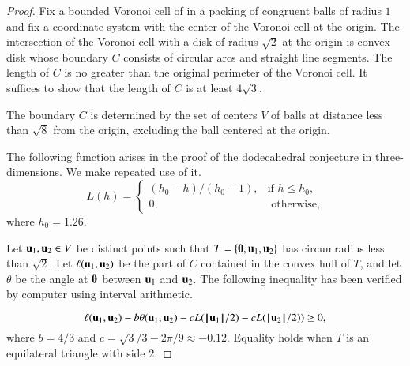 \documentclass{llncs}
\begin{document}
\begin{proof} Fix a bounded Voronoi cell of in a packing of congruent
  balls of radius $1$ and fix a coordinate system with the center of
  the Voronoi cell at the origin.  The intersection of the Voronoi
  cell with a disk of radius $\sqrt2$ at the origin is convex disk
  whose boundary $C$ consists of circular arcs and straight line
  segments.  The length of $C$ is no greater than the original
  perimeter of the Voronoi cell.  It suffices to show that the length
  of $C$ is at least $4\sqrt{3}$.



The boundary $C$ is determined by the set of centers $V$ of balls at
distance less than $\sqrt8$ from the origin, excluding the ball
centered at the origin.

The following function arises in the proof of the dodecahedral
conjecture in three-dimensions.  We make repeated use of it.
\begin{equation}
L(h) = \begin{cases} 
   (h_0-h)/(h_0-1),& \text{if } h \le h_0,\\
  0,&\text{ otherwise},
 \end{cases}
\end{equation}
where $h_0 = 1.26$. 

Let ${\mathbf u}_1,{\mathbf u}_2\in V$ be distinct points such that
$T=\{{\mathbf 0},{\mathbf u}_1,{\mathbf u}_2\}$ has circumradius less than $\sqrt2$.  Let
$\ell({\mathbf u}_1,{\mathbf u}_2)$ be the part of $C$ contained in the convex hull of
$T$, and let $\theta$ be the angle at ${\mathbf 0}$ between ${\mathbf u}_1$ and
${\mathbf u}_2$. 
The following inequality has been verified by computer using interval
arithmetic.





\begin{equation}\label{eqn:ineq} %
\ell(\u_1,\u_2) - b \theta(\u_1,\u_2) - c L(\normo{\u_1}/2) - c L(\normo{\u_2}/2)) \ge 0,
\end{equation}
where $b=4/3$ and $c=\sqrt3/3 - 2\pi/9 \approx -0.12$.
Equality holds when $T$ is an equilateral triangle with side $2$.


\end{proof}
\end{document}
